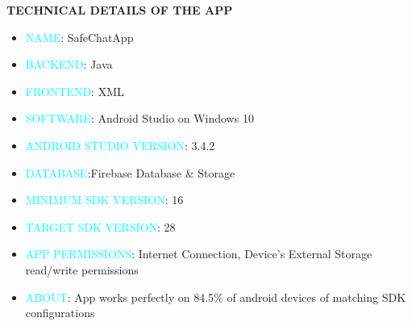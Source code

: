 \documentclass{beamer}
\begin{document}
\begin{frame}
\begin{tcolorbox}
\begin{center}
\textsc{\textbf{\textcolor{byzantium}{TECHNICAL DETAILS OF THE APP}}}
\end{center} 
\end{tcolorbox}
\begin{flushleft}
\begin{itemize}
\item \textcolor{cyan}{NAME}: SafeChatApp
\item \textcolor{cyan}{BACKEND}: Java 
\item \textcolor{cyan}{FRONTEND}: XML
\item \textcolor{cyan}{SOFTWARE}: Android Studio on Windows 10
\item \textcolor{cyan}{ANDROID STUDIO VERSION}: 3.4.2
\item \textcolor{cyan}{DATABASE}:Firebase Database \& Storage
\item \textcolor{cyan}{MINIMUM SDK VERSION}: 16
\item \textcolor{cyan}{TARGET SDK VERSION}: 28 
\item \textcolor{cyan}{APP PERMISSIONS}: Internet Connection, Device’s External Storage read/write permissions
\item \textcolor{cyan}{ABOUT}: App works perfectly on 84.5\% of android devices of matching SDK configurations
\end{itemize}
\end{flushleft}
\end{frame}
\end{document}
